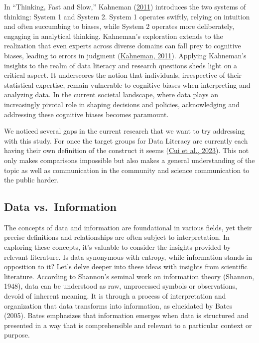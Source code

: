 \documentclass[
  12pt,
  a4paper,
  twoside]{article}
\begin{document}
In ``Thinking, Fast and Slow,'' Kahneman (\protect\hyperlink{ref-kahneman2011}{2011}) introduces the two systems of thinking: System 1 and System 2. System 1 operates swiftly, relying on intuition and often succumbing to biases, while System 2 operates more deliberately, engaging in analytical thinking. Kahneman's exploration extends to the realization that even experts across diverse domains can fall prey to cognitive biases, leading to errors in judgment (\protect\hyperlink{ref-kahneman2011}{Kahneman, 2011}).
Applying Kahneman's insights to the realm of data literacy and research questions sheds light on a critical aspect. It underscores the notion that individuals, irrespective of their statistical expertise, remain vulnerable to cognitive biases when interpreting and analyzing data. In the current societal landscape, where data plays an increasingly pivotal role in shaping decisions and policies, acknowledging and addressing these cognitive biases becomes paramount.

We noticed several gaps in the current research that we want to try addressing with this study. For once the target groups for Data Literacy are currently each having their own definition of the construct it seems (\protect\hyperlink{ref-Cui2023}{Cui et al., 2023}). This not only makes comparisons impossible but also makes a general understanding of the topic as well as communication in the community and science communication to the public harder.

\hypertarget{data-vs.-information}{%
\subsection{Data vs.~Information}\label{data-vs.-information}}

The concepts of data and information are foundational in various fields, yet their precise definitions and relationships are often subject to interpretation. In exploring these concepts, it's valuable to consider the insights provided by relevant literature. Is data synonymous with entropy, while information stands in opposition to it? Let's delve deeper into these ideas with insights from scientific literature.
According to Shannon's seminal work on information theory (Shannon, 1948), data can be understood as raw, unprocessed symbols or observations, devoid of inherent meaning. It is through a process of interpretation and organization that data transforms into information, as elucidated by Bates (2005). Bates emphasizes that information emerges when data is structured and presented in a way that is comprehensible and relevant to a particular context or purpose.
\end{document}
